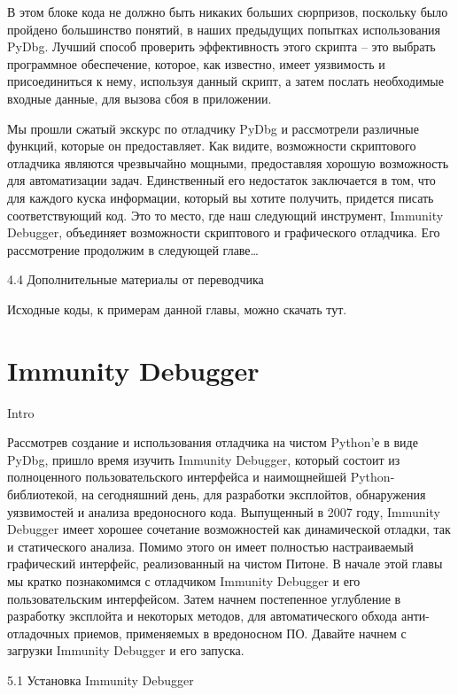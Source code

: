 \documentclass[12pt, a4paper, oneside]{book}
\begin{document}
В этом блоке кода не должно быть никаких больших сюрпризов, поскольку было пройдено большинство понятий, в наших предыдущих попытках использования PyDbg. Лучший способ проверить эффективность этого скрипта – это выбрать программное обеспечение, которое, как известно, имеет уязвимость и присоединиться к нему, используя данный скрипт, а затем послать необходимые входные данные, для вызова сбоя в приложении.

Мы прошли сжатый экскурс по отладчику PyDbg и рассмотрели различные функций, которые он предоставляет. Как видите, возможности скриптового отладчика являются чрезвычайно мощными, предоставляя хорошую возможность для автоматизации задач. Единственный его недостаток заключается в том, что для каждого куска информации, который вы хотите получить, придется писать соответствующий код. Это то место, где наш следующий инструмент, Immunity Debugger, объединяет возможности скриптового и графического отладчика. Его рассмотрение продолжим в следующей главе…


4.4 Дополнительные материалы от переводчика

Исходные коды, к примерам данной главы, можно скачать тут.

\chapter{Immunity Debugger}
Intro

Рассмотрев создание и использования отладчика на чистом Python’е в виде PyDbg, пришло время изучить Immunity Debugger, который состоит из полноценного пользовательского интерфейса и наимощнейшей Python-библиотекой, на сегодняшний день, для разработки эксплойтов, обнаружения уязвимостей и анализа вредоносного кода. Выпущенный в 2007 году, Immunity Debugger имеет хорошее сочетание возможностей как динамической отладки, так и статического анализа. Помимо этого он имеет полностью настраиваемый графический интерфейс, реализованный на чистом Питоне. В начале этой главы мы кратко познакомимся с отладчиком Immunity Debugger и его пользовательским интерфейсом. Затем начнем постепенное углубление в разработку эксплойта и некоторых методов, для автоматического обхода анти-отладочных приемов, применяемых в вредоносном ПО. Давайте начнем с загрузки Immunity Debugger и его запуска.


5.1 Установка Immunity Debugger
\end{document}
